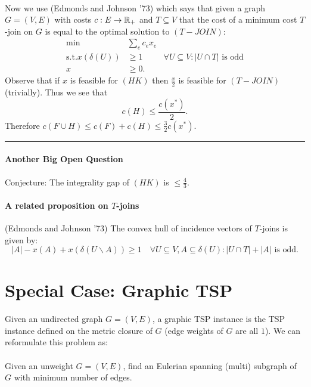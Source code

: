 \documentclass[letterpaper,12pt,oneside,onecolumn]{article}
\newenvironment{proof}{{\bf Proof:  }}{\hfill\rule{2mm}{2mm}}
\begin{document}
\begin{proof}
\paragraph{}
Now we use (Edmonds and Johnson '73) which says that given a graph $G=(V,E)$ with costs $c:E\rightarrow \mathbb{R}_+$ and $T\subseteq V$ that the cost of a minimum cost $T$-join on $G$ is equal to the optimal solution to $(T-JOIN)$:
\begin{align*}
\min &\sum_e c_ex_e \\
\text{s.t.} x(\delta(U)) &\geq 1 &\forall U \subseteq V : |U\cap T| \text{ is odd}\\
x&\geq 0.
\end{align*}
Observe that if $x$ is feasible for $(HK)$ then $\frac{x}{2}$ is feasible for $(T-JOIN)$ (trivially). Thus we see that
$$c(H) \leq \frac{c(x^*)}{2}.$$
Therefore $c(F\cup H) \leq c(F) + c(H) \leq \frac{3}{2}c(x^*).$
\end{proof}
\paragraph{Another Big Open Question}
Conjecture: The integrality gap of $(HK)$ is $\leq \frac{4}{3}$.
\paragraph{A related proposition on $T$-joins}
(Edmonds and Johnson '73) The convex hull of incidence vectors of $T$-joins is given by:
$$|A| - x(A) + x(\delta(U\backslash A)) \geq 1 \quad \forall U\subseteq V, A\subseteq \delta(U) : |U\cap T| + |A| \text{ is odd}.$$
\section{Special Case: Graphic TSP}
\paragraph{}
Given an undirected graph $G=(V,E)$, a graphic TSP instance is the TSP instance defined on the metric closure of $G$ (edge weights of $G$ are all $1$). We can reformulate this problem as: 
\paragraph{}
Given an unweight $G=(V,E)$, find an Eulerian spanning (multi) subgraph of $G$ with minimum number of edges.
\end{document}

